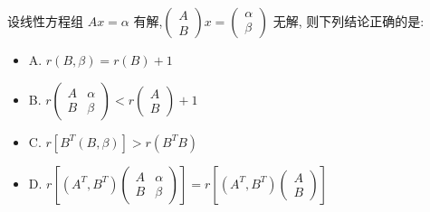 \begin{example}[][Exam: 35.4.8]
	设线性方程组 $Ax=\alpha$ 有解,$
	\begin{pmatrix}
		A\\B
	\end{pmatrix}x=
	\begin{pmatrix}
		\alpha\\\beta
	\end{pmatrix}$ 无解, 则下列结论正确的是:  
	\begin{itemize}
		\item A. $r(B,\beta)=r(B)+1$
		\item B. $r
		\begin{pmatrix}
			A&\alpha\\B&\beta
		\end{pmatrix}<r
		\begin{pmatrix}
		A\\B
		\end{pmatrix}+1$
		\item C. $r\left[B^{T}(B,\beta)\right]>r(B^{T}B)$ 
		\item D. $r\left[(A^T,B^T)
		\begin{pmatrix}
			A&\alpha\\B&\beta
		\end{pmatrix}\right] =r\left[ (A^T,B^T)
		\begin{pmatrix}
		A\\B
		\end{pmatrix}\right]$
	\end{itemize}
	
\end{example}
